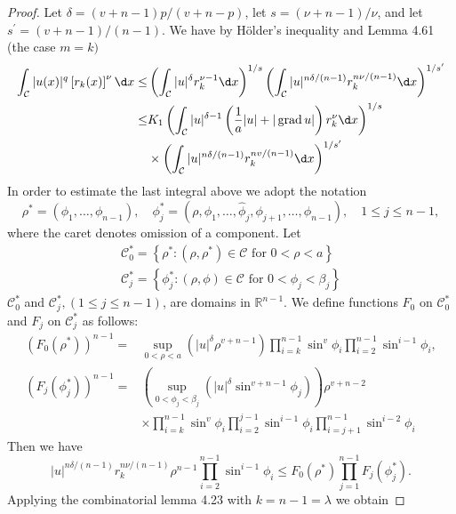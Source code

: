 \begin{proof}
  Let $\delta=(v+n-1) p /(v+n-p)$, let $s=(\nu+n-1) / \nu$, and let $s^{\prime}=(v+n-1) /(n-1)$. We have by Hölder's inequality and Lemma 4.61 (the case $m=k)$
  \[
  \begin{aligned}
  \int_{\mathcal{C}}|u(x)|^q\left[r_k(x)\right]^\nu \d x \leq & \left(\int_{\mathcal{C}}|u|^\delta r_k^{\nu-1} \d x\right)^{1 / s}\left(\int_{\mathcal{C}}|u|^{n \delta /(n-1)} r_k^{n \nu /(n-1)} \d x\right)^{1 / s^{\prime}} \\
  \leq & K_1\left(\int_{\mathcal{C}}|u|^{\delta-1}\left(\frac{1}{a}|u|+|\grad u|\right) r_k^\nu \d x\right)^{1 / s} \\
  & \times\left(\int_{\mathcal{C}}|u|^{n \delta /(n-1)} r_k^{n v /(n-1)} \d x\right)^{1 / s^{\prime}}
  \end{aligned}
  \]
  In order to estimate the last integral above we adopt the notation
  \[
  \rho^*=\left(\phi_1, \ldots, \phi_{n-1}\right), \quad \phi_j^*=\left(\rho, \phi_1, \ldots, \hat{\phi}_j, \phi_{j+1}, \ldots, \phi_{n-1}\right), \quad 1 \leq j \leq n-1,
  \]
  where the caret denotes omission of a component. Let
  \[
  \begin{gathered}
  \mathcal{C}_0^*=\left\{\rho^*:\left(\rho, \rho^*\right) \in \mathcal{C} \text { for } 0<\rho<a\right\} \\
  \mathcal{C}_j^*=\left\{\phi_j^*:(\rho, \phi) \in \mathcal{C} \text { for } 0<\phi_j<\beta_j\right\}
  \end{gathered}
  \]
  $\mathcal{C}_0^*$ and $\mathcal{C}_j^*,(1 \leq j \leq n-1)$, are domains in $\mathbb{R}^{n-1}$. We define functions $F_0$ on $\mathcal{C}_0^*$ and $F_j$ on $\mathcal{C}_j^*$ as follows:
  \[
  \begin{aligned}
  \left(F_0\left(\rho^*\right)\right)^{n-1}= & \sup _{0<\rho<a}\left(|u|^\delta \rho^{v+n-1}\right) \prod_{i=k}^{n-1} \sin ^v \phi_i \prod_{i=2}^{n-1} \sin ^{i-1} \phi_i, \\
  \left(F_j\left(\phi_j^*\right)\right)^{n-1}= & \left(\sup _{0<\phi_j<\beta_j}\left(|u|^\delta \sin ^{v+n-1} \phi_j\right)\right) \rho^{v+n-2} \\
  & \times \prod_{i=k}^{n-1} \sin ^v \phi_i \prod_{i=2}^{j-1} \sin ^{i-1} \phi_i \prod_{i=j+1}^{n-1} \sin ^{i-2} \phi_i
  \end{aligned}
  \]
  Then we have
  \[
  |u|^{n \delta /(n-1)} r_k^{n \nu /(n-1)} \rho^{n-1} \prod_{i=2}^{n-1} \sin ^{i-1} \phi_i \leq F_0\left(\rho^*\right) \prod_{j=1}^{n-1} F_j\left(\phi_j^*\right) .
  \]
  Applying the combinatorial lemma 4.23 with $k=n-1=\lambda$ we obtain

\end{proof}
